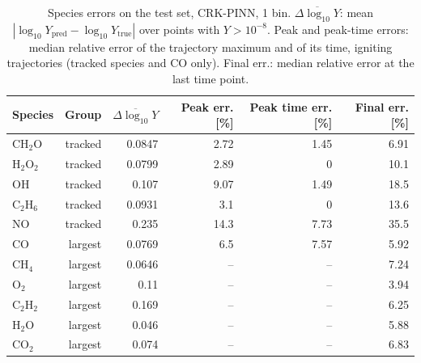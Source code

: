 \begin{table}[htbp]
    \centering
    \small
    \begin{tabular}{lrrrrr}
        \hline
        Species & Group & $\overline{\Delta\log_{10}Y}$ & Peak err. [\%] & Peak time err. [\%] & Final err. [\%] \\
        \hline
        $\mathrm{CH_{2}O}$ & tracked & 0.0847 & 2.72 & 1.45 & 6.91 \\
        $\mathrm{H_{2}O_{2}}$ & tracked & 0.0799 & 2.89 & 0 & 10.1 \\
        $\mathrm{OH}$ & tracked & 0.107 & 9.07 & 1.49 & 18.5 \\
        $\mathrm{C_{2}H_{6}}$ & tracked & 0.0931 & 3.1 & 0 & 13.6 \\
        $\mathrm{NO}$ & tracked & 0.235 & 14.3 & 7.73 & 35.5 \\
        $\mathrm{CO}$ & largest & 0.0769 & 6.5 & 7.57 & 5.92 \\
        $\mathrm{CH_{4}}$ & largest & 0.0646 & -- & -- & 7.24 \\
        $\mathrm{O_{2}}$ & largest & 0.11 & -- & -- & 3.94 \\
        $\mathrm{C_{2}H_{2}}$ & largest & 0.169 & -- & -- & 6.25 \\
        $\mathrm{H_{2}O}$ & largest & 0.046 & -- & -- & 5.88 \\
        $\mathrm{CO_{2}}$ & largest & 0.074 & -- & -- & 6.83 \\
        \hline
    \end{tabular}
    \caption{Species errors on the test set, CRK-PINN, 1 bin. $\overline{\Delta\log_{10}Y}$: mean $|\log_{10}Y_\mathrm{pred}-\log_{10}Y_\mathrm{true}|$ over points with $Y>10^{-8}$. Peak and peak-time errors: median relative error of the trajectory maximum and of its time, igniting trajectories (tracked species and CO only). Final err.: median relative error at the last time point.}
    \label{tab:species_crkpinn_predicted_b1}
\end{table}
